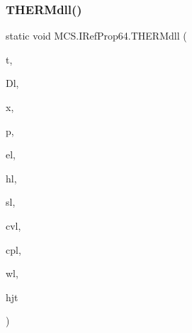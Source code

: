 \subsubsection{\texorpdfstring{T\+H\+E\+R\+Mdll()}{THERMdll()}}
{\footnotesize\ttfamily static void M\+C\+S.\+I\+Ref\+Prop64.\+T\+H\+E\+R\+Mdll (\begin{DoxyParamCaption}\item[{ref double}]{t,  }\item[{ref double}]{Dl,  }\item[{\mbox{[}\+Marshal\+As(\+Unmanaged\+Type.\+L\+P\+Array, Size\+Param\+Index=0)\mbox{]} double \mbox{[}$\,$\mbox{]}}]{x,  }\item[{ref double}]{p,  }\item[{ref double}]{el,  }\item[{ref double}]{hl,  }\item[{ref double}]{sl,  }\item[{ref double}]{cvl,  }\item[{ref double}]{cpl,  }\item[{ref double}]{wl,  }\item[{ref double}]{hjt }\end{DoxyParamCaption})}

\hypertarget{class_m_c_s_1_1_i_ref_prop64_a126e52a573b76237231084e79e0537ce}{}\label{class_m_c_s_1_1_i_ref_prop64_a126e52a573b76237231084e79e0537ce} 
